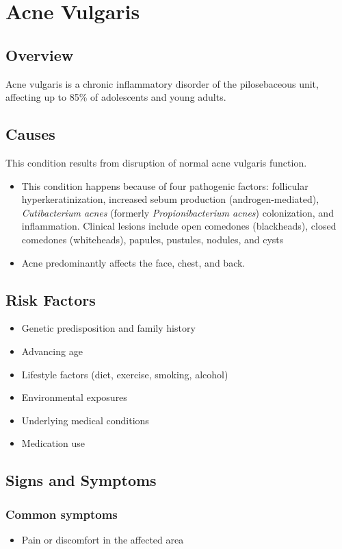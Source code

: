 \chapter{Acne Vulgaris}
\label{sec:Acne Vulgaris}

\section{Overview}
Acne vulgaris is a chronic inflammatory disorder of the pilosebaceous unit, affecting up to 85\% of adolescents and young adults.
\section{Causes}
This condition results from disruption of normal acne vulgaris function.

\begin{itemize}[noitemsep]
  \item This condition happens because of four pathogenic factors: follicular hyperkeratinization, increased sebum production (androgen-mediated), \textit{Cutibacterium acnes} (formerly \textit{Propionibacterium acnes}) colonization, and inflammation. Clinical lesions include open comedones (blackheads), closed comedones (whiteheads), papules, pustules, nodules, and cysts
  \item Acne predominantly affects the face, chest, and back.
\end{itemize}
\section{Risk Factors}


\begin{itemize}[noitemsep]
  \item Genetic predisposition and family history
  \item Advancing age
  \item Lifestyle factors (diet, exercise, smoking, alcohol)
  \item Environmental exposures
  \item Underlying medical conditions
  \item Medication use
\end{itemize}
\section{Signs and Symptoms}

\subsection{Common symptoms}
\begin{itemize}[noitemsep]
  \item Pain or discomfort in the affected area
  \end{itemize}

